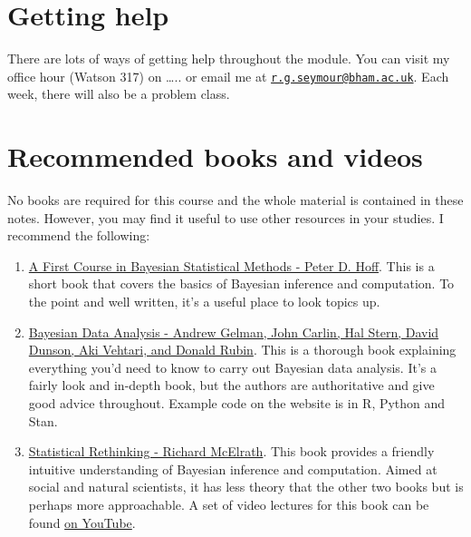 \documentclass[
]{book}
\theoremstyle{definition}
\theoremstyle{definition}
\theoremstyle{definition}
\theoremstyle{definition}
\theoremstyle{remark}
\begin{document}
\hypertarget{getting-help}{%
\section{Getting help}\label{getting-help}}

There are lots of ways of getting help throughout the module. You can visit my office hour (Watson 317) on \ldots.. or email me at \href{mailto:r.g.seymour@bham.ac.uk}{\nolinkurl{r.g.seymour@bham.ac.uk}}. Each week, there will also be a problem class.

\hypertarget{recommended-books-and-videos}{%
\section{Recommended books and videos}\label{recommended-books-and-videos}}

No books are required for this course and the whole material is contained in these notes. However, you may find it useful to use other resources in your studies. I recommend the following:

\begin{enumerate}
\def\labelenumi{\arabic{enumi}.}
\item
  \href{https://link.springer.com/book/10.1007/978-0-387-92407-6}{A First Course in Bayesian Statistical Methods - Peter D. Hoff}. This is a short book that covers the basics of Bayesian inference and computation. To the point and well written, it's a useful place to look topics up.
\item
  \href{http://www.stat.columbia.edu/~gelman/book/}{Bayesian Data Analysis - Andrew Gelman, John Carlin, Hal Stern, David Dunson, Aki Vehtari, and Donald Rubin}. This is a thorough book explaining everything you'd need to know to carry out Bayesian data analysis. It's a fairly look and in-depth book, but the authors are authoritative and give good advice throughout. Example code on the website is in R, Python and Stan.
\item
  \href{https://xcelab.net/rm/statistical-rethinking/}{Statistical Rethinking - Richard McElrath}. This book provides a friendly intuitive understanding of Bayesian inference and computation. Aimed at social and natural scientists, it has less theory that the other two books but is perhaps more approachable. A set of video lectures for this book can be found \href{https://www.youtube.com/playlist?list=PLDcUM9US4XdMROZ57-OIRtIK0aOynbgZN}{on YouTube}.
\end{enumerate}
\end{document}
